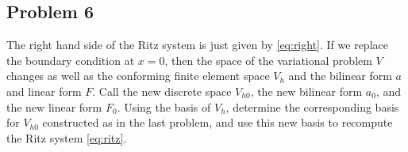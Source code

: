 \documentclass{article}
\theoremstyle{definition}
\theoremstyle{plain}
\begin{document}
\subsection{Problem 6}
The right hand side of the Ritz system is just given by \eqref{eq:right}.
If we replace the boundary condition at $x = 0$, then the space of the variational problem $V$ changes as well as the conforming finite element space $V_h$ and the bilinear form $a$ and linear form $F$.
Call the new discrete space $V_{h0}$, the new bilinear form $a_0$, and the new linear form $F_0$.
Using the basis of $V_h$, determine the corresponding basis for $V_{h0}$ constructed as in the last problem, and use this new basis to recompute the Ritz system \eqref{eq:ritz}.
\end{document}
